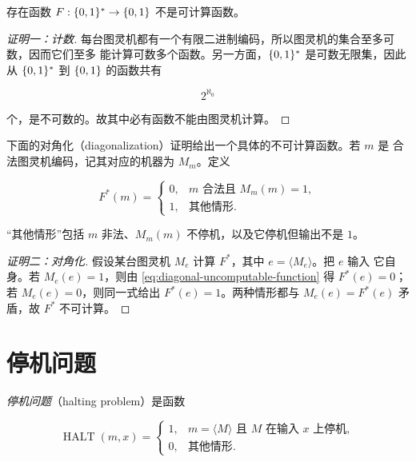 \begin{theorem}[不可计算函数的存在性]
  \label{thm:uncomputable-function-exists}
  存在函数 $F:\{0,1\}^{*}\to\{0,1\}$ 不是可计算函数。
\end{theorem}

\begin{proof}[证明一：计数]
  每台图灵机都有一个有限二进制编码，所以图灵机的集合至多可数，因而它们至多
  能计算可数多个函数。另一方面，$\{0,1\}^{*}$ 是可数无限集，因此从
  $\{0,1\}^{*}$ 到 $\{0,1\}$ 的函数共有

  \[
    2^{\aleph_0}
  \]

  个，是不可数的。故其中必有函数不能由图灵机计算。
\end{proof}

下面的对角化（diagonalization）证明给出一个具体的不可计算函数。若 $m$ 是
合法图灵机编码，记其对应的机器为 $M_m$。定义

\begin{equation}
  \label{eq:diagonal-uncomputable-function}
  F^*(m)=
  \begin{cases}
    0,&m\text{ 合法且 }M_m(m)=1,\\
    1,&\text{其他情形}.
  \end{cases}
\end{equation}

“其他情形”包括 $m$ 非法、$M_m(m)$ 不停机，以及它停机但输出不是 $1$。

\begin{proof}[证明二：对角化]
  假设某台图灵机 $M_e$ 计算 $F^*$，其中 $e=\langle M_e\rangle$。把 $e$ 输入
  它自身。若 $M_e(e)=1$，则由 \cref{eq:diagonal-uncomputable-function} 得
  $F^*(e)=0$；若 $M_e(e)=0$，则同一式给出 $F^*(e)=1$。两种情形都与
  $M_e(e)=F^*(e)$ 矛盾，故 $F^*$ 不可计算。
\end{proof}

\section{停机问题}

\begin{definition}[停机问题]
  \label{def:halting-problem}
  \emph{停机问题}（halting problem）是函数

  \[
    \operatorname{HALT}(m,x)=
    \begin{cases}
      1,&m=\langle M\rangle\text{ 且 }M\text{ 在输入 }x\text{ 上停机},\\
      0,&\text{其他情形}.
    \end{cases}
  \]
\end{definition}

